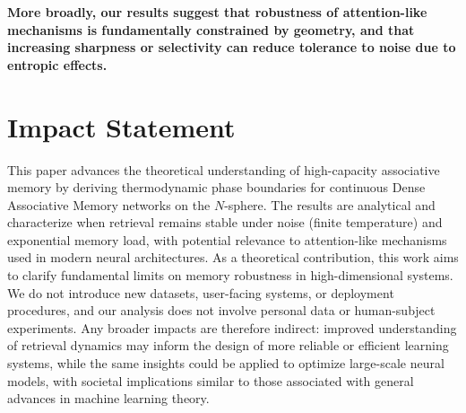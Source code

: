 \documentclass{article}
\theoremstyle{plain}
\theoremstyle{definition}
\theoremstyle{remark}
\begin{document}
\textbf{More broadly, our results suggest that robustness of attention-like mechanisms is fundamentally constrained by geometry, and that increasing sharpness or selectivity can reduce tolerance to noise due to entropic effects.}












\section*{Impact Statement}

This paper advances the theoretical understanding of high-capacity associative memory by deriving thermodynamic phase boundaries for continuous Dense Associative Memory networks on the $N$-sphere. The results are analytical and characterize when retrieval remains stable under noise (finite temperature) and exponential memory load, with potential relevance to attention-like mechanisms used in modern neural architectures. As a theoretical contribution, this work aims to clarify fundamental limits on memory robustness in high-dimensional systems. We do not introduce new datasets, user-facing systems, or deployment procedures, and our analysis does not involve personal data or human-subject experiments. Any broader impacts are therefore indirect: improved understanding of retrieval dynamics may inform the design of more reliable or efficient learning systems, while the same insights could be applied to optimize large-scale neural models, with societal implications similar to those associated with general advances in machine learning theory.
\end{document}
